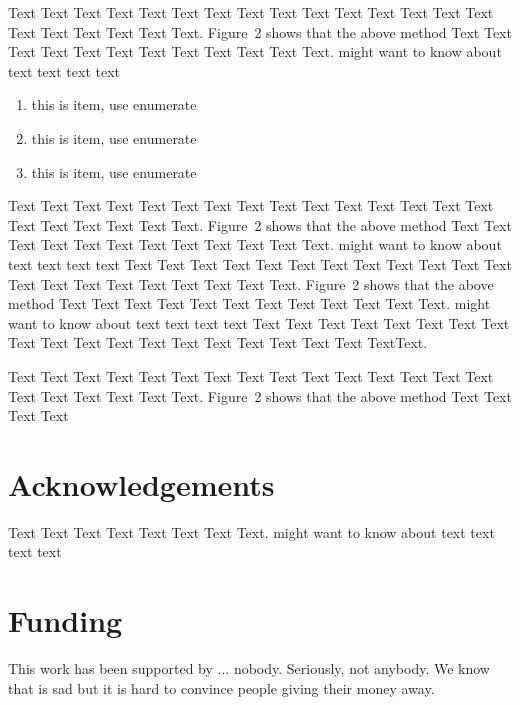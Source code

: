 \documentclass{bioinfo}
\begin{document}
Text Text Text Text Text Text  Text Text Text Text Text Text Text
Text Text  Text Text Text Text Text Text.
Figure~2\vphantom{\ref{fig:02}} shows that the above method  Text
Text Text Text  Text Text Text Text Text Text  Text Text.
\citealp{Bag01} might want to know about  text text text text

\begin{enumerate}
\item this is item, use enumerate
\item this is item, use enumerate
\item this is item, use enumerate
\end{enumerate}

Text Text Text Text Text Text Text Text Text Text Text Text Text
Text Text Text Text Text Text Text Text.
Figure~2\vphantom{\ref{fig:02}} shows\vadjust{\pagebreak} that the
above method  Text Text Text Text Text Text Text Text Text Text
Text Text.  \citealp{Bag01} might want to know about text
text text text Text Text Text Text Text Text  Text Text Text Text
Text Text Text Text Text Text Text Text Text Text Text.
Figure~2\vphantom{\ref{fig:02}} shows that the above method  Text
Text Text Text Text Text Text Text Text Text  Text Text.
\citealp{Bag01} might want to know about text text text text
Text Text Text Text Text Text  Text Text Text Text Text Text Text
Text Text Text Text Text Text Text\break Text.


Text Text Text Text Text Text  Text Text Text Text Text Text Text
Text Text  Text Text Text Text Text Text.
Figure~2\vphantom{\ref{fig:02}} shows that the above method  Text
Text Text Text\vspace*{-10pt}


\section*{Acknowledgements}

Text Text Text Text Text Text  Text Text.  \citealp{Bag01} might want to know about  text
text text text\vspace*{-12pt}

\section*{Funding}

This work has been supported by ... nobody. Seriously, not anybody. We know that is sad but it is hard 
to convince people giving their money away.

%
%
%
%
%
%
%
%
%
\end{document}
